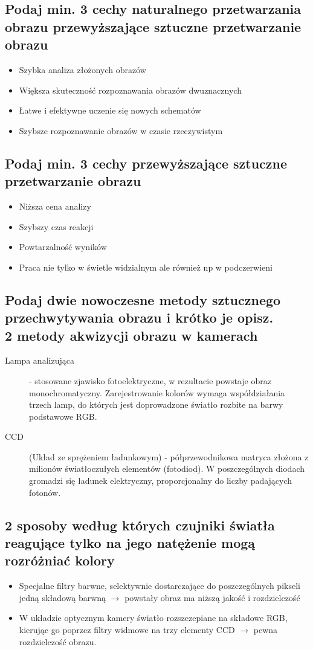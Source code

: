 \documentclass[a4paper, 12pt, titlepage]{article}
\begin{document}
\subsection{Podaj min. 3 cechy naturalnego przetwarzania obrazu przewyższające sztuczne przetwarzanie obrazu}
\begin{itemize}
	\item Szybka analiza złożonych obrazów
	\item Większa skuteczność rozpoznawania obrazów dwuznacznych
	\item Łatwe i efektywne uczenie się nowych schematów
	\item Szybsze rozpoznawanie obrazów w czasie rzeczywistym
\end{itemize}

\subsection{Podaj min. 3 cechy przewyższające sztuczne przetwarzanie obrazu}
\begin{itemize}
	\item Niższa cena analizy
	\item Szybszy czas reakcji
	\item Powtarzalność wyników
	\item Praca nie tylko w świetle widzialnym ale również np w podczerwieni
\end{itemize}

\subsection{Podaj dwie nowoczesne metody sztucznego przechwytywania obrazu i krótko je opisz. \\ 2 metody akwizycji obrazu w kamerach}
\begin{description}
	\item[Lampa analizująca] - stosowane zjawisko fotoelektryczne, w rezultacie powstaje obraz monochromatyczny. Zarejestrowanie kolorów wymaga współdziałania trzech lamp, do których jest doprowadzone światło rozbite na barwy podstawowe RGB.
	\item[CCD] (Układ ze sprężeniem ładunkowym) - półprzewodnikowa matryca złożona z milionów światłoczułych elementów (fotodiod). W poszczególnych diodach gromadzi się ładunek elektryczny, proporcjonalny do liczby padających fotonów.
\end{description}

\subsection{2 sposoby według których czujniki światła reagujące tylko na jego natężenie mogą rozróżniać kolory}
\begin{itemize}
	\item Specjalne filtry barwne, selektywnie dostarczające do poszczególnych pikseli jedną składową barwną $\rightarrow$ powstały obraz ma niższą jakość i rozdzielczość
	\item W układzie optycznym kamery światło rozszczepiane na składowe RGB, kierując go poprzez filtry widmowe na trzy elementy CCD $\rightarrow$ pewna rozdzielczość obrazu.
\end{itemize}
\end{document}
